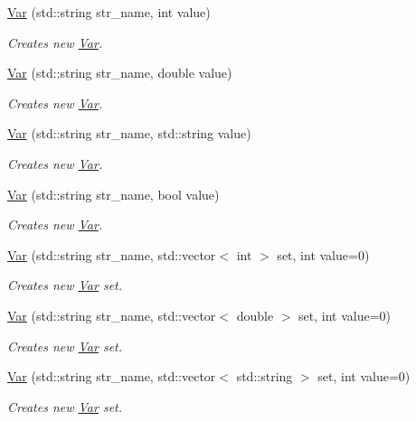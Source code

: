 \begin{DoxyCompactItemize}
\hyperlink{structostendo_1_1Var_a54737db1fa6cd70f182ad2a7b1904f7d}{Var} (std\+::string str\+\_\+name, int value)
\begin{DoxyCompactList}\small\item\em Creates new \hyperlink{structostendo_1_1Var}{Var}. \end{DoxyCompactList}\item 
\hyperlink{structostendo_1_1Var_a12e2c20b81280d34d13a77b39c57f96d}{Var} (std\+::string str\+\_\+name, double value)
\begin{DoxyCompactList}\small\item\em Creates new \hyperlink{structostendo_1_1Var}{Var}. \end{DoxyCompactList}\item 
\hyperlink{structostendo_1_1Var_aa80859e63a7df5c1beab958e621637b8}{Var} (std\+::string str\+\_\+name, std\+::string value)
\begin{DoxyCompactList}\small\item\em Creates new \hyperlink{structostendo_1_1Var}{Var}. \end{DoxyCompactList}\item 
\hyperlink{structostendo_1_1Var_a2a1b2e8999f04386e78330662734fc52}{Var} (std\+::string str\+\_\+name, bool value)
\begin{DoxyCompactList}\small\item\em Creates new \hyperlink{structostendo_1_1Var}{Var}. \end{DoxyCompactList}\item 
\hyperlink{structostendo_1_1Var_add66e15a270e6dc6dbdc81e707ebae2a}{Var} (std\+::string str\+\_\+name, std\+::vector$<$ int $>$ set, int value=0)
\begin{DoxyCompactList}\small\item\em Creates new \hyperlink{structostendo_1_1Var}{Var} set. \end{DoxyCompactList}\item 
\hyperlink{structostendo_1_1Var_ab359f9ded169486b261d4aca717acee1}{Var} (std\+::string str\+\_\+name, std\+::vector$<$ double $>$ set, int value=0)
\begin{DoxyCompactList}\small\item\em Creates new \hyperlink{structostendo_1_1Var}{Var} set. \end{DoxyCompactList}\item 
\hyperlink{structostendo_1_1Var_af987ac6b851f5d62984e32f54850ae70}{Var} (std\+::string str\+\_\+name, std\+::vector$<$ std\+::string $>$ set, int value=0)
\begin{DoxyCompactList}\small\item\em Creates new \hyperlink{structostendo_1_1Var}{Var} set. \end{DoxyCompactList}\item 

\end{DoxyCompactItemize}
